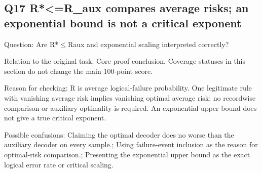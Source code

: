 \documentclass[11pt,a4paper]{article}
\begin{document}
\clearpage
\subsection{Q17 R*<=R\_aux compares average risks; an exponential bound is not a critical exponent}
\label{aspect:Q17}
Question: Are R*\ensuremath{\leq}Raux and exponential scaling interpreted correctly?

Relation to the original task: Core proof conclusion. Coverage statuses in this section do not change the main 100-point score.

Reason for checking: R is average logical-failure probability. One legitimate rule with vanishing average risk implies vanishing optimal average risk; no recordwise comparison or auxiliary optimality is required. An exponential upper bound does not give a true critical exponent.

Possible confusions: Claiming the optimal decoder does no worse than the auxiliary decoder on every sample.; Using failure-event inclusion as the reason for optimal-risk comparison.; Presenting the exponential upper bound as the exact logical error rate or critical scaling.
\end{document}
